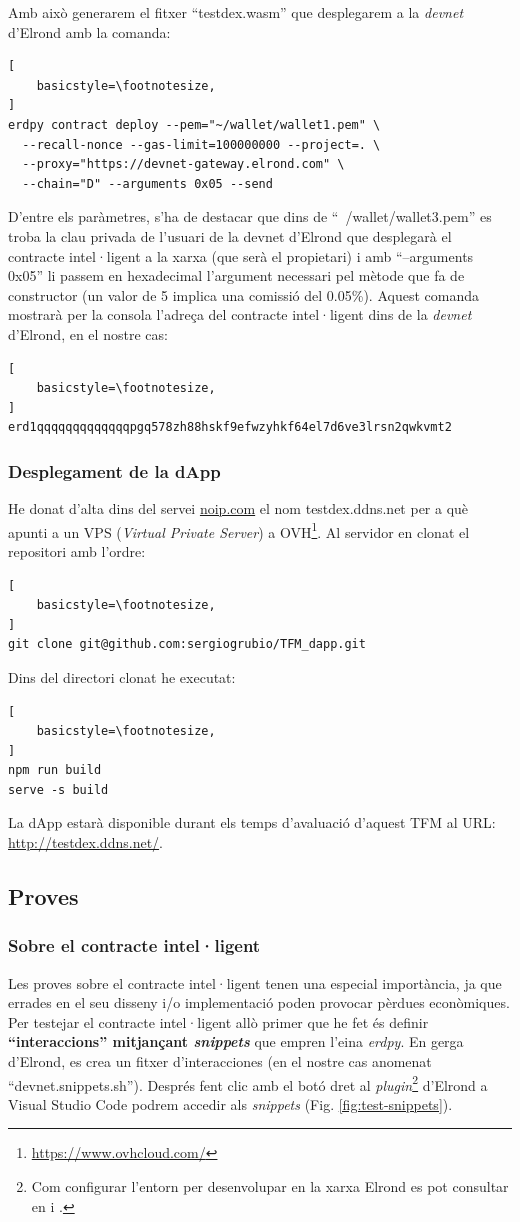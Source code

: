 \documentclass[11pt,a4paper]{article}
\begin{document}
Amb això generarem el fitxer ``testdex.wasm'' que desplegarem a la \textit{devnet} d'Elrond amb la comanda:
\begin{lstlisting}[
    basicstyle=\footnotesize,
]
erdpy contract deploy --pem="~/wallet/wallet1.pem" \
  --recall-nonce --gas-limit=100000000 --project=. \
  --proxy="https://devnet-gateway.elrond.com" \
  --chain="D" --arguments 0x05 --send
\end{lstlisting}

D'entre els paràmetres, s'ha de destacar que dins de ``~/wallet/wallet3.pem'' es troba la clau privada de l'usuari de la devnet d'Elrond que desplegarà el contracte intel·ligent a la xarxa (que serà el propietari) i amb ``--arguments 0x05'' li passem en hexadecimal l'argument necessari pel mètode que fa de constructor (un valor de 5 implica una comissió del 0.05\%). Aquest comanda mostrarà per la consola l'adreça del contracte intel·ligent dins de la \textit{devnet} d'Elrond, en el nostre cas:
\begin{lstlisting}[
    basicstyle=\footnotesize,
]
erd1qqqqqqqqqqqqqpgq578zh88hskf9efwzyhkf64el7d6ve3lrsn2qwkvmt2
\end{lstlisting}

\subsubsection{Desplegament de la dApp}
He donat d'alta dins del servei \url{noip.com} el nom testdex.ddns.net per a què apunti a un VPS (\textit{Virtual Private Server}) a OVH\footnote{\url{https://www.ovhcloud.com/}}. Al servidor en clonat el repositori amb l'ordre:
\begin{lstlisting}[
    basicstyle=\footnotesize,
]
git clone git@github.com:sergiogrubio/TFM_dapp.git
\end{lstlisting}
Dins del directori clonat he executat:
\begin{lstlisting}[
    basicstyle=\footnotesize,
]
npm run build
serve -s build
\end{lstlisting}
La dApp estarà disponible durant els temps d'avaluació d'aquest TFM al URL:
\url{http://testdex.ddns.net/}.

\subsection{Proves}
\subsubsection{Sobre el contracte intel·ligent}\label{subsub:sc}
Les proves sobre el contracte intel·ligent tenen una especial importància, ja que errades en el seu disseny i/o implementació poden provocar pèrdues econòmiques. Per testejar el contracte intel·ligent allò primer que he fet és definir \textbf{``interaccions'' mitjançant \textit{snippets}} que empren l'eina \textit{erdpy}. En gerga d'Elrond, es crea un fitxer d'interacciones (en el nostre cas anomenat ``devnet.snippets.sh''). Després fent clic amb el botó dret al \textit{plugin}\footnote{Com configurar l'entorn per desenvolupar en la xarxa Elrond es pot consultar en \cite{elrondnet2020} i \cite{ton2021}.} d'Elrond a Visual Studio Code podrem accedir als \textit{snippets} (Fig. \ref{fig:test-snippets}).
\end{document}

